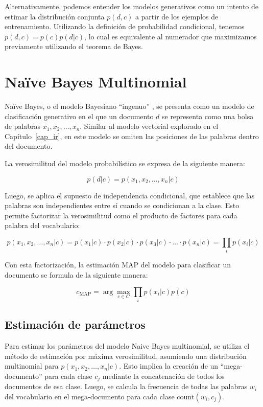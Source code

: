 \documentclass[11pt,fleqn]{book} %
\begin{document}
Alternativamente, podemos entender los modelos generativos como un intento de estimar la distribución conjunta $p(d, c)$ a partir de los ejemplos de entrenamiento. Utilizando la definición de probabilidad condicional, tenemos $p(d, c) = p(c)p(d|c)$, lo cual es equivalente al numerador que maximizamos previamente utilizando el teorema de Bayes.

\section{Naïve Bayes Multinomial}

Naïve Bayes, o el modelo Bayesiano ``ingenuo'' \cite{mccallum1998comparison}, se presenta como un modelo de clasificación generativo en el que un documento $d$ se representa como una bolsa de palabras $x_1, x_2, \ldots, x_n$. Similar al modelo vectorial explorado en el Capítulo~\ref{cap_ir}, en este modelo se omiten las posiciones de las palabras dentro del documento.

La verosimilitud del modelo probabilístico se expresa de la siguiente manera:

\[
p(d|c) = p(x_1, x_2, \ldots, x_n | c)
\]

Luego, se aplica el supuesto de independencia condicional, que establece que las palabras son independientes entre sí cuando se condicionan a la clase. Esto permite factorizar la verosimilitud como el producto de factores para cada palabra del vocabulario:

\[
p(x_1, x_2, \ldots, x_n | c) = p(x_1 | c) \cdot p(x_2 | c) \cdot p(x_3 | c) \cdot \ldots \cdot p(x_n | c) = \prod_{i} p(x_i | c)
\]

Con esta factorización, la estimación MAP del modelo para clasificar un documento se formula de la siguiente manera:

\[
c_{\text{MAP}} = \arg\max_{c \in C} \prod_{i} p(x_i | c)p(c)
\]

\subsection{Estimación de parámetros}

Para estimar los parámetros del modelo Naive Bayes multinomial, se utiliza el método de estimación por máxima verosimilitud, asumiendo una distribución multinomial para $p(x_1, x_2, \ldots, x_n | c)$. Esto implica la creación de un ``mega-documento'' para cada clase $c_j$ mediante la concatenación de todos los documentos de esa clase. Luego, se calcula la frecuencia de todas las palabras $w_i$ del vocabulario en el mega-documento para cada clase $\text{count}(w_i, c_j)$.
\end{document}
